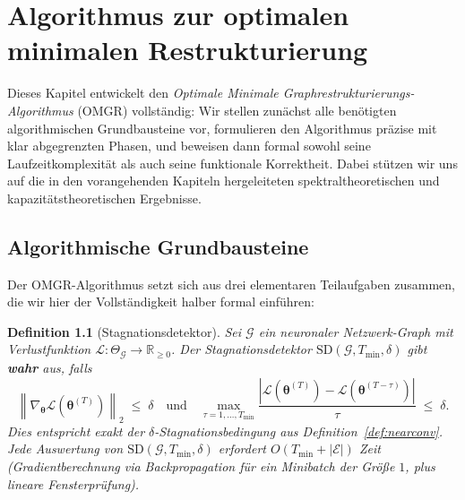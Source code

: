 ﻿\documentclass[12pt, a4paper, openany]{report}
\newtheorem{definition}[theorem]{Definition}
\newcommand{\R}{\mathbb{R}}
\newcommand{\calG}{\mathcal{G}}
\newcommand{\calL}{\mathcal{L}}
\newcommand{\calE}{\mathcal{E}}
\newcommand{\norms}[1]{\left\|#1\right\|}
\newcommand{\abs}[1]{\left|#1\right|}
\begin{document}
\chapter{Algorithmus zur optimalen minimalen Restrukturierung}
\label{sec:algorithm}

Dieses Kapitel entwickelt den \emph{Optimale Minimale Graphrestrukturierungs-Algorithmus}
(OMGR) vollständig: Wir stellen zunächst alle benötigten algorithmischen
Grundbausteine vor, formulieren den Algorithmus präzise mit klar abgegrenzten
Phasen, und beweisen dann formal sowohl seine Laufzeitkomplexität als auch
seine funktionale Korrektheit.  Dabei stützen wir uns auf die in den vorangehenden
Kapiteln hergeleiteten spektraltheoretischen und kapazitätstheoretischen
Ergebnisse.

\section{Algorithmische Grundbausteine}
\label{sec:algo_building_blocks}

Der OMGR-Algorithmus setzt sich aus drei elementaren Teilaufgaben zusammen,
die wir hier der Vollständigkeit halber formal einführen:

\begin{definition}[Stagnationsdetektor]
\label{def:stagnation_detector}
Sei $\calG$ ein neuronaler Netzwerk-Graph mit Verlustfunktion
$\calL : \Theta_{\calG} \to \R_{\geq 0}$.  Der \emph{Stagnationsdetektor}
$\mathrm{SD}(\calG, T_{\min}, \delta)$ gibt \textbf{wahr} aus, falls
\begin{equation}
  \label{eq:sd_condition}
  \norms{\nabla_{\bm{\theta}} \calL(\bm{\theta}^{(T)})}_2 \;\leq\; \delta
  \quad\text{und}\quad
  \max_{\tau=1,\ldots,T_{\min}}
  \frac{\abs{\calL(\bm{\theta}^{(T)}) - \calL(\bm{\theta}^{(T-\tau)})}}{\tau}
  \;\leq\; \delta.
\end{equation}
Dies entspricht exakt der $\delta$-Stagnationsbedingung aus
Definition~\ref{def:nearconv}.  Jede Auswertung von
$\mathrm{SD}(\calG, T_{\min}, \delta)$ erfordert
$O(T_{\min} + |\calE|)$ Zeit (Gradientberechnung via Backpropagation
für ein Minibatch der Größe $1$, plus lineare Fensterprüfung).
\end{definition}
\end{document}
